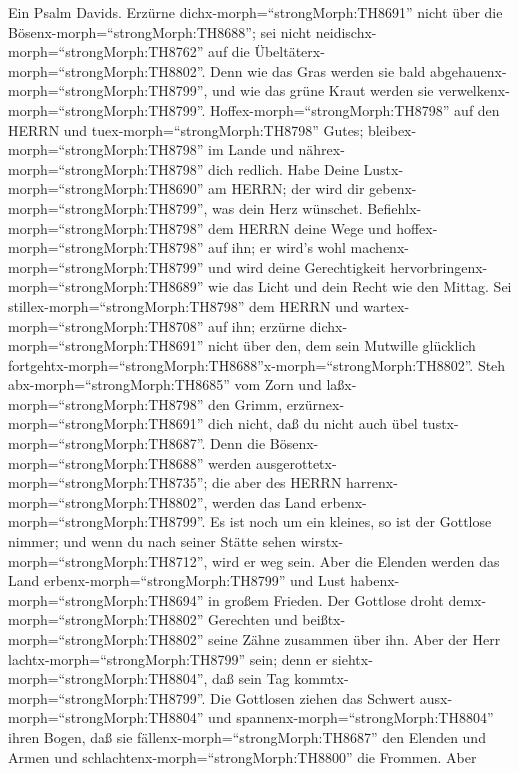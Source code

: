  Ein Psalm Davids. Erzürne
dichx-morph=``strongMorph:TH8691'' nicht über die
Bösenx-morph=``strongMorph:TH8688''; sei nicht
neidischx-morph=``strongMorph:TH8762'' auf die
Übeltäterx-morph=``strongMorph:TH8802''.  Denn wie das Gras
werden sie bald abgehauenx-morph=``strongMorph:TH8799'', und wie das
grüne Kraut werden sie verwelkenx-morph=``strongMorph:TH8799''.
 Hoffex-morph=``strongMorph:TH8798'' auf den HERRN und
tuex-morph=``strongMorph:TH8798'' Gutes;
bleibex-morph=``strongMorph:TH8798'' im Lande und
nährex-morph=``strongMorph:TH8798'' dich redlich.  Habe
Deine Lustx-morph=``strongMorph:TH8690'' am HERRN; der wird dir
gebenx-morph=``strongMorph:TH8799'', was dein Herz wünschet.
 Befiehlx-morph=``strongMorph:TH8798'' dem HERRN deine Wege
und hoffex-morph=``strongMorph:TH8798'' auf ihn; er wird's wohl
machenx-morph=``strongMorph:TH8799''  und wird deine
Gerechtigkeit hervorbringenx-morph=``strongMorph:TH8689'' wie das Licht
und dein Recht wie den Mittag.  Sei
stillex-morph=``strongMorph:TH8798'' dem HERRN und
wartex-morph=``strongMorph:TH8708'' auf ihn; erzürne
dichx-morph=``strongMorph:TH8691'' nicht über den, dem sein Mutwille
glücklich
fortgehtx-morph=``strongMorph:TH8688''x-morph=``strongMorph:TH8802''.
 Steh abx-morph=``strongMorph:TH8685'' vom Zorn und
laßx-morph=``strongMorph:TH8798'' den Grimm,
erzürnex-morph=``strongMorph:TH8691'' dich nicht, daß du nicht auch übel
tustx-morph=``strongMorph:TH8687''.  Denn die
Bösenx-morph=``strongMorph:TH8688'' werden
ausgerottetx-morph=``strongMorph:TH8735''; die aber des HERRN
harrenx-morph=``strongMorph:TH8802'', werden das Land
erbenx-morph=``strongMorph:TH8799''.  Es ist noch um ein
kleines, so ist der Gottlose nimmer; und wenn du nach seiner Stätte
sehen wirstx-morph=``strongMorph:TH8712'', wird er weg sein.
 Aber die Elenden werden das Land
erbenx-morph=``strongMorph:TH8799'' und Lust
habenx-morph=``strongMorph:TH8694'' in großem Frieden.  Der
Gottlose droht demx-morph=``strongMorph:TH8802'' Gerechten und
beißtx-morph=``strongMorph:TH8802'' seine Zähne zusammen über ihn.
 Aber der Herr lachtx-morph=``strongMorph:TH8799'' sein;
denn er siehtx-morph=``strongMorph:TH8804'', daß sein Tag
kommtx-morph=``strongMorph:TH8799''.  Die Gottlosen ziehen
das Schwert ausx-morph=``strongMorph:TH8804'' und
spannenx-morph=``strongMorph:TH8804'' ihren Bogen, daß sie
fällenx-morph=``strongMorph:TH8687'' den Elenden und Armen und
schlachtenx-morph=``strongMorph:TH8800'' die Frommen.  Aber
